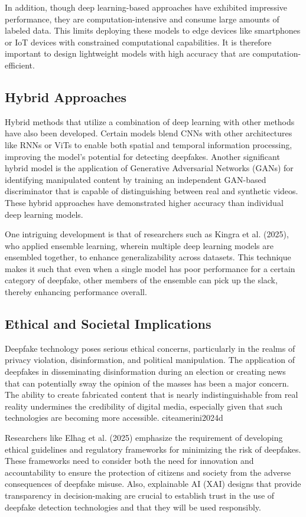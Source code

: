 \documentclass[lettersize,journal]{IEEEtran}
\begin{document}
In addition, though deep learning-based approaches have exhibited impressive performance, they are computation-intensive and consume large amounts of labeled data. This limits deploying these models to edge devices like smartphones or IoT devices with constrained computational capabilities. It is therefore important to design lightweight models with high accuracy that are computation-efficient.

\subsection{Hybrid Approaches}
Hybrid methods that utilize a combination of deep learning with other methods have also been developed. Certain models blend CNNs with other architectures like RNNs or ViTs to enable both spatial and temporal information processing, improving the model's potential for detecting deepfakes. Another significant hybrid model is the application of Generative Adversarial Networks (GANs) for identifying manipulated content by training an independent GAN-based discriminator that is capable of distinguishing between real and synthetic videos. These hybrid approaches have demonstrated higher accuracy than individual deep learning models.

One intriguing development is that of researchers such as Kingra et al. (2025), who applied ensemble learning, wherein multiple deep learning models are ensembled together, to enhance generalizability across datasets. This technique makes it such that even when a single model has poor performance for a certain category of deepfake, other members of the ensemble can pick up the slack, thereby enhancing performance overall.

\subsection{Ethical and Societal Implications}
Deepfake technology poses serious ethical concerns, particularly in the realms of privacy violation, disinformation, and political manipulation. The application of deepfakes in disseminating disinformation during an election or creating news that can potentially sway the opinion of the masses has been a major concern. The ability to create fabricated content that is nearly indistinguishable from real reality undermines the credibility of digital media, especially given that such technologies are becoming more accessible.
cite{amerini2024d}

Researchers like Elhag et al. (2025) emphasize the requirement of developing ethical guidelines and regulatory frameworks for minimizing the risk of deepfakes. These frameworks need to consider both the need for innovation and accountability to ensure the protection of citizens and society from the adverse consequences of deepfake misuse. Also, explainable AI (XAI) designs that provide transparency in decision-making are crucial to establish trust in the use of deepfake detection technologies and that they will be used responsibly.
\end{document}
